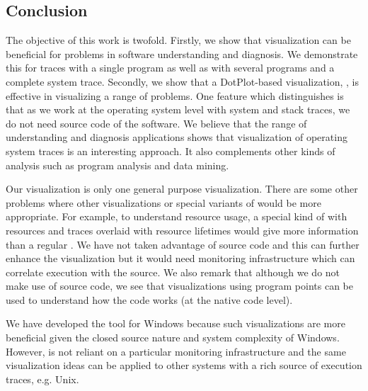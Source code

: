 \subsection{Conclusion}
\label{sec:conclusion}

The objective of this work is twofold.
Firstly, we show that visualization can be beneficial for problems
in software understanding and diagnosis. We demonstrate this
for traces with a single program as well as with
several programs and a complete system trace.
Secondly, we show that a DotPlot-based visualization, \VDP{}, is effective
in visualizing a range of problems.
One feature which distinguishes \lviz{} is that as we work
at the operating system level with system and stack traces, 
we do not need source code of the software.
We believe that the range of understanding and diagnosis applications
shows that visualization of operating system traces is an interesting approach.
It also complements other kinds of analysis such
as program analysis and data mining.

Our \VDP{} visualization is only one general purpose visualization.
There are some other problems where other visualizations \cite{dep-icse} or special
variants of \VDP{} would be more appropriate. For example, to understand
resource usage, a special kind of \VDP{} with resources and traces overlaid
with resource lifetimes would give more information than a regular \VDP{}.
We have not taken advantage of source code and this can further enhance
the visualization but it would need monitoring infrastructure which
can correlate execution with the source.
We also remark that although we do not make use of source code, we
see that visualizations using program points can be used to understand 
how the code works (at the native code level).

We have developed the \VDP{} tool for Windows because such visualizations
are more beneficial given the closed source nature and system complexity
of Windows. 
However, \VDP{} is not reliant on a particular monitoring 
infrastructure and the same visualization ideas can be applied
to other systems with a rich source of execution traces, e.g. Unix.
